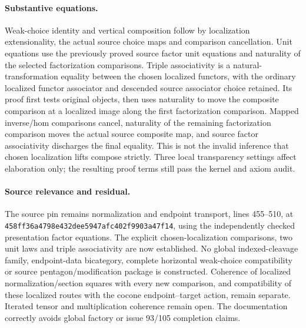 \documentclass{article}
\begin{document}
\paragraph{Substantive equations.} Weak-choice identity and vertical composition follow by localization extensionality, the actual source choice maps and comparison cancellation. Unit equations use the previously proved source factor unit equations and naturality of the selected factorization comparisons. Triple associativity is a natural-transformation equality between the chosen localized functors, with the ordinary localized functor associator and descended source associator choice retained. Its proof first tests original objects, then uses naturality to move the composite comparison at a localized image along the first factorization comparison. Mapped inverse/hom comparisons cancel, naturality of the remaining factorization comparison moves the actual source composite map, and source factor associativity discharges the final equality. This is not the invalid inference that chosen localization lifts compose strictly. Three local transparency settings affect elaboration only; the resulting proof terms still pass the kernel and axiom audit.
\paragraph{Source relevance and residual.} The source pin remains normalization and endpoint transport, lines 455--510, at \texttt{458ff36a4798e432dee5947afc402f9903a47f14}, using the independently checked presentation factor equations. The explicit chosen-localization comparisons, two unit laws and triple associativity are now established. No global indexed-cleavage family, endpoint-data bicategory, complete horizontal weak-choice compatibility or source pentagon/modification package is constructed. Coherence of localized normalization/section squares with every new comparison, and compatibility of these localized routes with the cocone endpoint--target action, remain separate. Iterated tensor and multiplication coherence remain open. The documentation correctly avoids global factory or issue 93/105 completion claims.
\end{document}
